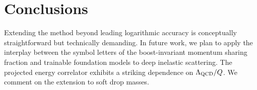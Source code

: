 \section{Conclusions}\label{sec:conclusions}

Extending the method beyond leading logarithmic accuracy is conceptually
straightforward but technically demanding. In future work, we plan to
apply the interplay between the symbol letters of the boost-invariant
momentum sharing fraction and trainable foundation models to deep
inelastic scattering. The projected energy correlator exhibits a
striking dependence on $\Lambda_{\rm QCD}/Q$. We comment on the
extension to soft drop masses.

